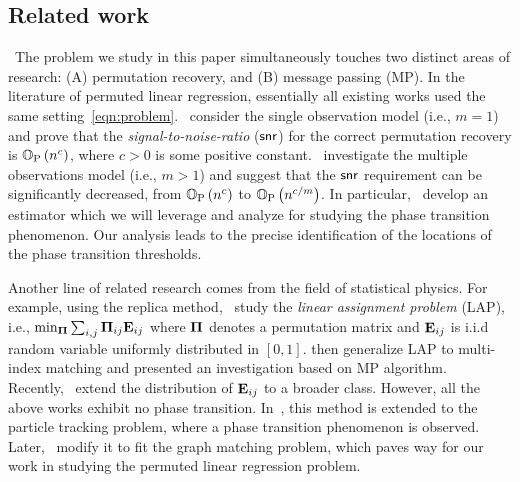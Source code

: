 \documentclass[11pt]{article}
\begin{document}
\subsection{Related work}\ The problem we study in this paper simultaneously touches two distinct areas of research: (A) permutation recovery, and (B) message passing (MP). In the  literature of
permuted linear regression, essentially all existing works used the same setting~\eqref{eqn:problem}.~\citet{pananjady2016linear, slawski2017linear} consider the
single observation model (i.e., $m =1$) and prove that the \emph{signal-to-noise-ratio} ($\mathsf{snr}$) for
the correct permutation recovery is $\mathbb{O}_{\textup{P}}\left(n^c\right)$, where $c>0$
is some positive constant.~\citet{slawski2019two, zhang2020optimal, zhang2022benefits} investigate the multiple observations model (i.e., $m>1$) and suggest that the $\mathsf{snr}$ requirement can be significantly decreased, from $\mathbb{O}_{\textup{P}}\left(n^c\right)$ to $\mathbb{O}_{\textup{P}}\left(n^{c/m}\right)$. In particular,~\citet{zhang2020optimal} develop an estimator which we will leverage and analyze for studying the phase transition phenomenon.  Our analysis leads to the precise identification of  the locations of the phase transition thresholds.

Another line of related research comes from
the field of
statistical physics. For example, using the replica method,~\citet{mezard1985replicas,mezard1986mean}
study the \emph{linear assignment problem} (LAP), i.e.,
$\min_{\boldsymbol{\Pi}}\sum_{i,j}\boldsymbol{\Pi}_{ij}\mathbf{E}_{ij}$
where $\boldsymbol{\Pi}$ denotes a permutation matrix and
$\mathbf{E}_{ij}$ is i.i.d random variable uniformly distributed in $[0, 1]$.
\citet{martin2005random} then generalize
 LAP to multi-index matching and presented an investigation
based on MP algorithm.
Recently,~\citet{caracciolo2017finite, malatesta2019fluctuations}
extend the distribution of $\mathbf{E}_{ij}$ to a broader class.
However, all the above works exhibit no phase transition.
In~\citet{chertkov2010inference}, this method is extended
to the particle tracking problem, where a phase transition phenomenon
is observed. Later,~\citet{semerjian2020recovery} modify
it to fit the graph matching problem, which paves way
for our work in studying the permuted linear regression problem.
\end{document}
